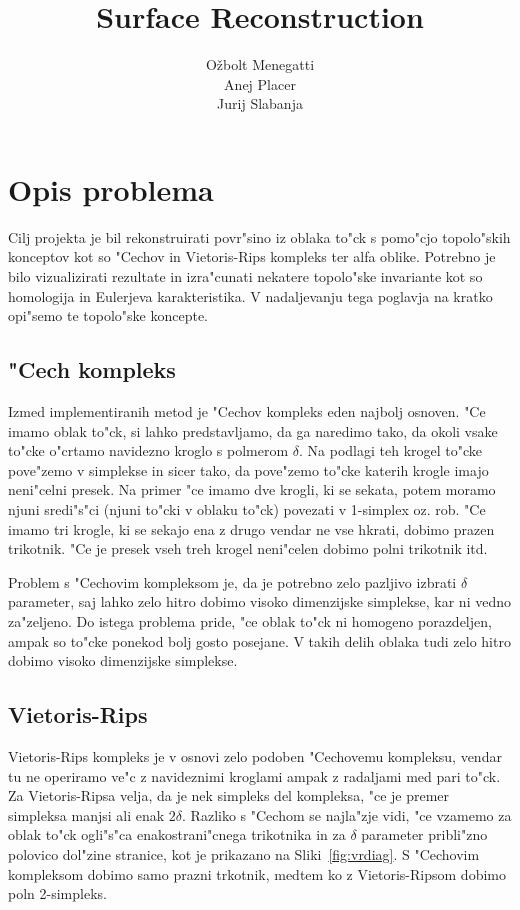 \documentclass[11pt]{article}
\title{\textbf{Surface Reconstruction}}
\author{O\v zbolt Menegatti\\
		Anej Placer\\
		Jurij Slabanja}
\date{}
\begin{document}
\maketitle

\section{Opis problema}

Cilj projekta je bil rekonstruirati povr"sino iz oblaka to"ck s pomo"cjo topolo"skih konceptov kot so "Cechov in Vietoris-Rips kompleks ter alfa oblike. Potrebno je bilo vizualizirati rezultate in izra"cunati nekatere topolo"ske invariante kot so homologija in Eulerjeva karakteristika. V nadaljevanju tega poglavja na kratko opi"semo te topolo"ske koncepte.

\subsection{"Cech kompleks}
Izmed implementiranih metod je "Cechov kompleks eden najbolj osnoven. "Ce imamo oblak to"ck, si lahko predstavljamo, da ga naredimo tako, da okoli vsake to"cke o"crtamo navidezno kroglo s polmerom $\delta$. Na podlagi teh krogel to"cke pove"zemo v simplekse in sicer tako, da pove"zemo to"cke katerih krogle imajo neni"celni presek. Na primer "ce imamo dve krogli, ki se sekata, potem moramo njuni sredi"s"ci (njuni to"cki v oblaku to"ck) povezati v 1-simplex oz. rob. "Ce imamo tri krogle, ki se sekajo ena z drugo vendar ne vse hkrati, dobimo prazen trikotnik. "Ce je presek vseh treh krogel neni"celen dobimo polni trikotnik itd. 

Problem s "Cechovim kompleksom je, da je potrebno zelo pazljivo izbrati $\delta$ parameter, saj lahko zelo hitro dobimo visoko dimenzijske simplekse, kar ni vedno za"zeljeno. Do istega problema pride, "ce oblak to"ck ni homogeno porazdeljen, ampak so to"cke ponekod bolj gosto posejane. V takih delih oblaka tudi zelo hitro dobimo visoko dimenzijske simplekse.

\subsection{Vietoris-Rips}
Vietoris-Rips kompleks je v osnovi zelo podoben "Cechovemu kompleksu, vendar tu ne operiramo ve"c z navideznimi kroglami ampak z radaljami med pari to"ck. Za Vietoris-Ripsa velja, da je nek simpleks del kompleksa, "ce je premer simpleksa manjsi ali enak $2\delta$. Razliko s "Cechom se najla"zje vidi, "ce vzamemo za oblak to"ck ogli"s"ca enakostrani"cnega trikotnika in za $\delta$ parameter pribli"zno polovico dol"zine stranice, kot je prikazano na Sliki~\ref{fig:vrdiag}. S "Cechovim kompleksom dobimo samo prazni trkotnik, medtem ko z Vietoris-Ripsom dobimo poln 2-simpleks.
\end{document}
